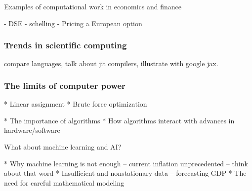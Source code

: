 \documentclass[
    xcolor={svgnames,dvipsnames},
    hyperref={colorlinks, citecolor=DeepPink4, linkcolor=DarkRed, urlcolor=DarkBlue}
    ]{beamer}  %
\newcommand{\1}{\mathbbm 1}
\begin{document}
\begin{frame}
    
    Examples of computational work in economics and finance

    - DSE
    - schelling
    - Pricing a European option 

\end{frame}


\begin{frame}
    \frametitle{Trends in scientific computing}

    compare languages, talk about jit compilers, illustrate with google jax.

\end{frame}


\begin{frame}
    \frametitle{The limits of computer power}

    * Linear assignment
    * Brute force optimization
        
\end{frame}

\begin{frame}
    
    * The importance of algorithms
    * How algorithms interact with advances in hardware/software

\end{frame}

\begin{frame}

    What about machine learning and AI?

    * Why machine learning is not enough -- current inflation unprecedented -- think about that word
    * Insufficient and nonstationary data -- forecasting GDP
    * The need for careful mathematical modeling
    
\end{frame}
\end{document}
